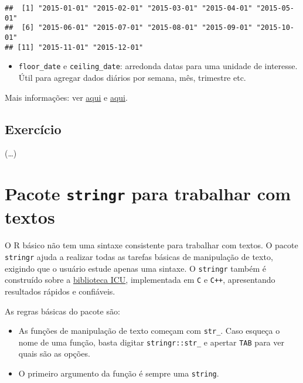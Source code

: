 \documentclass[]{book}
\providecommand{\tightlist}{%
  \setlength{\itemsep}{0pt}\setlength{\parskip}{0pt}}
\begin{document}
\begin{verbatim}
##  [1] "2015-01-01" "2015-02-01" "2015-03-01" "2015-04-01" "2015-05-01"
##  [6] "2015-06-01" "2015-07-01" "2015-08-01" "2015-09-01" "2015-10-01"
## [11] "2015-11-01" "2015-12-01"
\end{verbatim}

\begin{itemize}
\tightlist
\item
  \texttt{floor\_date} e \texttt{ceiling\_date}: arredonda datas para
  uma unidade de interesse. Útil para agregar dados diários por semana,
  mês, trimestre etc.
\end{itemize}

Mais informações: ver
\href{https://cran.r-project.org/web/packages/lubridate/vignettes/lubridate.html}{aqui}
e
\href{https://www.jstatsoft.org/index.php/jss/article/view/v040i03/v40i03.pdf}{aqui}.

\subsection{Exercício}\label{exercicio}

(\ldots{})

\section{\texorpdfstring{Pacote \texttt{stringr} para trabalhar com
textos}{Pacote stringr para trabalhar com textos}}\label{pacote-stringr-para-trabalhar-com-textos}

O R básico não tem uma sintaxe consistente para trabalhar com textos. O
pacote \texttt{stringr} ajuda a realizar todas as tarefas básicas de
manipulação de texto, exigindo que o usuário estude apenas uma sintaxe.
O \texttt{stringr} também é construído sobre a
\href{http://site.icu-project.org/}{biblioteca ICU}, implementada em
\texttt{C} e \texttt{C++}, apresentando resultados rápidos e confiáveis.

As regras básicas do pacote são:

\begin{itemize}
\tightlist
\item
  As funções de manipulação de texto começam com \texttt{str\_}. Caso
  esqueça o nome de uma função, basta digitar \texttt{stringr::str\_} e
  apertar \texttt{TAB} para ver quais são as opções.
\item
  O primeiro argumento da função é sempre uma \texttt{string}.
\end{itemize}
\end{document}
